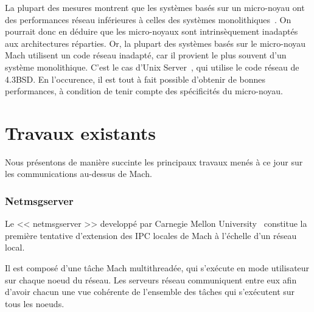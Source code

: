 La plupart des mesures montrent que les syst\`emes
bas\'es sur un micro-noyau ont des performances r\'eseau inf\'erieures
\`a celles des syst\`emes monolithiques~\cite{Maeda92}. On
pourrait donc en d\'eduire que les micro-noyaux sont intrins\`equement
inadapt\'es aux architectures r\'eparties. 
Or, la plupart des syst\`emes bas\'es sur le micro-noyau Mach
utilisent un code r\'eseau inadapt\'e, car il provient le plus souvent d'un syst\`eme monolithique. C'est le cas d'Unix Server~\cite{Golub90}, qui utilise le code r\'eseau de 4.3BSD.
En l'occurence, il est tout \`a fait possible d'obtenir de bonnes performances, \`a condition de tenir compte des sp\'ecificit\'es du micro-noyau.

\section {Travaux existants}

Nous pr\'esentons de mani\`ere succinte les principaux travaux men\'es \`a ce 
jour sur les communications au-dessus de Mach. 

\subsubsection{Netmsgserver}

Le << netmsgserver >> developp\'e par Carnegie Mellon University~\cite{Sansom86} constitue la premi\`ere tentative d'extension des IPC locales de Mach \`a l'\'echelle
d'un r\'eseau local.

Il est compos\'e d'une t\^ache Mach multithread\'ee, qui s'ex\'ecute en mode
utilisateur sur chaque noeud du r\'eseau. Les serveurs r\'eseau communiquent
entre eux afin d'avoir chacun une vue coh\'erente de l'ensemble des t\^aches
qui s'ex\'ecutent sur tous les noeuds.

